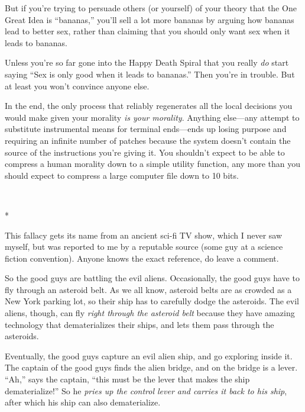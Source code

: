 {
 But if you're trying to persuade others (or
yourself) of your theory that the One Great Idea is
``bananas,'' you'll
sell a lot more bananas by arguing how bananas lead to better sex,
rather than claiming that you should only want sex when it leads to
bananas.}

{
 Unless you're so far gone into the Happy Death
Spiral that you really \textit{do} start saying ``Sex
is only good when it leads to bananas.'' Then
you're in trouble. But at least you
won't convince anyone else.}

{
 In the end, the only process that reliably regenerates all the
local decisions you would make given your morality \textit{is your
morality}. Anything else---any attempt to substitute instrumental means
for terminal ends---ends up losing purpose and requiring an infinite
number of patches because the system doesn't contain
the source of the instructions you're giving it. You
shouldn't expect to be able to compress a human
morality down to a simple utility function, any more than you should
expect to compress a large computer file down to 10 bits.}

{\centering
 \ ~
\par}

{\centering
 *
\par}


{
 This fallacy gets its name from an ancient sci-fi TV show, which I
never saw myself, but was reported to me by a reputable source (some
guy at a science fiction convention). Anyone knows the exact reference,
do leave a comment. }

{
 So the good guys are battling the evil aliens. Occasionally, the
good guys have to fly through an asteroid belt. As we all know,
asteroid belts are as crowded as a New York parking lot, so their ship
has to carefully dodge the asteroids. The evil aliens, though, can fly
\textit{right through the asteroid belt} because they have amazing
technology that dematerializes their ships, and lets them pass through
the asteroids.}

{
 Eventually, the good guys capture an evil alien ship, and go
exploring inside it. The captain of the good guys finds the alien
bridge, and on the bridge is a lever.
``Ah,'' says the captain,
``this must be the lever that makes the ship
dematerialize!'' So he \textit{pries up the control
lever and carries it back to his ship}, after which his ship can also
dematerialize.}


